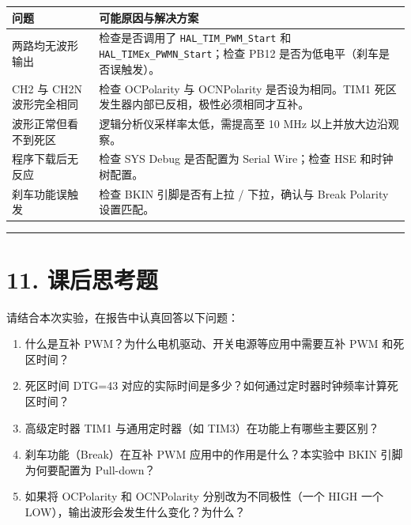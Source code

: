 \documentclass[
  chinese,
  UTF8,
  oneside,
  openany]{ctexbook}
\providecommand{\tightlist}{%
  \setlength{\itemsep}{0pt}\setlength{\parskip}{0pt}}
\begin{document}
\begin{longtable}[]{@{}
  >{\raggedright\arraybackslash}p{}
  >{\raggedright\arraybackslash}p{}@{}}
\toprule\noalign{}
\begin{minipage}[b]{\linewidth}\raggedright
问题
\end{minipage} & \begin{minipage}[b]{\linewidth}\raggedright
可能原因与解决方案
\end{minipage} \\
\midrule\noalign{}
\endhead
\bottomrule\noalign{}
\endlastfoot
两路均无波形输出 & 检查是否调用了 \texttt{HAL\_TIM\_PWM\_Start} 和
\texttt{HAL\_TIMEx\_PWMN\_Start}；检查 PB12
是否为低电平（刹车是否误触发）。 \\
CH2 与 CH2N 波形完全相同 & 检查 OCPolarity 与 OCNPolarity
是否设为相同。TIM1 死区发生器内部已反相，极性必须相同才互补。 \\
波形正常但看不到死区 & 逻辑分析仪采样率太低，需提高至 10 MHz
以上并放大边沿观察。 \\
程序下载后无反应 & 检查 SYS Debug 是否配置为 Serial Wire；检查 HSE
和时钟树配置。 \\
刹车功能误触发 & 检查 BKIN 引脚是否有上拉 / 下拉，确认与 Break Polarity
设置匹配。 \\
\end{longtable}

\begin{center}\rule{0.5\linewidth}{0.5pt}\end{center}

\section{11. 课后思考题}\label{ux8bfeux540eux601dux8003ux9898-5}

请结合本次实验，在报告中认真回答以下问题：

\begin{enumerate}
\def\labelenumi{\arabic{enumi}.}
\tightlist
\item
  什么是互补 PWM？为什么电机驱动、开关电源等应用中需要互补 PWM
  和死区时间？
\item
  死区时间 DTG=43
  对应的实际时间是多少？如何通过定时器时钟频率计算死区时间？
\item
  高级定时器 TIM1 与通用定时器（如 TIM3）在功能上有哪些主要区别？
\item
  刹车功能（Break）在互补 PWM 应用中的作用是什么？本实验中 BKIN
  引脚为何要配置为 Pull-down？
\item
  如果将 OCPolarity 和 OCNPolarity 分别改为不同极性（一个 HIGH 一个
  LOW），输出波形会发生什么变化？为什么？
\end{enumerate}
\end{document}
